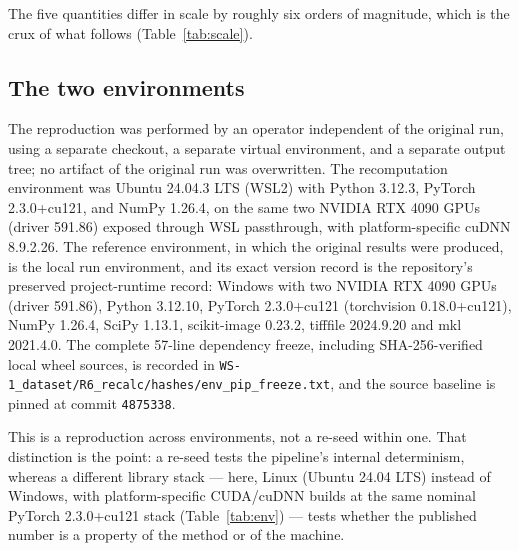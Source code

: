 \documentclass[11pt]{article}
\begin{document}
The five quantities differ in scale by roughly six orders of magnitude, which is the crux of what
follows (Table~\ref{tab:scale}).

\begin{table}[ht]
\centering

\caption{\textbf{The reported quantities and their natural scales.} A single absolute tolerance is
simultaneously far too loose for a bounded index and far too tight for an observer statistic of
order $10^{5}$--$10^{6}$. The declared criterion in the right-hand column is the one adopted after
the audit in Section~\ref{sec:ladder}.}
\label{tab:scale}
\end{table}

\subsection{The two environments}

The reproduction was performed by an operator independent of the original run, using a separate
checkout, a separate virtual environment, and a separate output tree; no artifact of the original
run was overwritten. The recomputation environment was Ubuntu 24.04.3 LTS (WSL2) with Python 3.12.3,
PyTorch 2.3.0+cu121, and NumPy 1.26.4, on the same two NVIDIA RTX 4090 GPUs (driver 591.86) exposed
through WSL passthrough, with platform-specific cuDNN 8.9.2.26. The reference environment,
in which the original results were produced, is the local run environment, and its exact version
record is the repository's preserved project-runtime record: Windows with two NVIDIA RTX 4090 GPUs
(driver 591.86), Python 3.12.10, PyTorch 2.3.0+cu121 (torchvision 0.18.0+cu121), NumPy 1.26.4,
SciPy 1.13.1, scikit-image 0.23.2, tifffile 2024.9.20 and mkl 2021.4.0. The complete 57-line
dependency freeze, including SHA-256-verified local wheel sources, is recorded in
\texttt{WS-1\_dataset/R6\_recalc/hashes/env\_pip\_freeze.txt}, and the source baseline is pinned at
commit \texttt{4875338}.

This is a reproduction across environments, not a re-seed within one. That distinction is the point:
a re-seed tests the pipeline's internal determinism, whereas a different library stack --- here,
Linux (Ubuntu 24.04 LTS) instead of Windows, with platform-specific CUDA/cuDNN builds at the
same nominal PyTorch 2.3.0+cu121 stack (Table~\ref{tab:env}) --- tests whether the published number
is a property of the method or of the machine.
\end{document}
